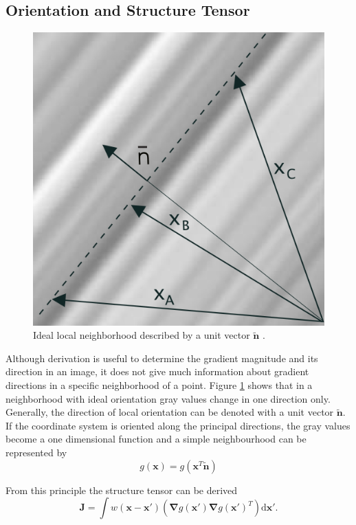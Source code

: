		
		\subsection{Orientation and Structure Tensor}
		\begin{figure} %
			\centering
			\includegraphics[scale=.5]{images/structure_tensor_intro.png}
			\caption{Ideal local neighborhood described by a unit vector $\tilde{\mathbf{n}}$ \citep{JaehneBook}.}
			\label{fig:struct_tensor_intro}
		\end{figure}
		Although derivation is useful to determine the gradient magnitude and its direction in an image, it does not give much information about gradient directions in a specific neighborhood of a point. Figure \ref{fig:struct_tensor_intro} shows that in a neighborhood with ideal orientation gray values change in one direction only. Generally, the direction of local orientation can be denoted with a unit vector $\tilde{\mathbf{n}}$. If the coordinate system is oriented along the principal directions, the gray values become a one dimensional function and a simple neighbourhood can be represented by
		\begin{equation}
			g(\mathbf{x}) = g(\mathbf{x}^T \tilde{\mathbf{n}})
		\end{equation}

		From this principle the structure tensor can be derived \citep{JaehneBook}
		\begin{equation} 
			\mathbf{J} = \int w(\mathbf{x} - \mathbf{x'}) 
								\left( 
									\mathbf{\nabla}g(\mathbf{x'}) \mathbf{\nabla}g(\mathbf{x'})^T
								\right)
								\text{d}\mathbf{x'}.
		\end{equation}
		
